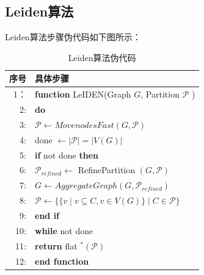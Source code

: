 \documentclass {article}
\begin{document}
	\subsection{Leiden算法}
	\label{Leiden算法原理}
	Leiden算法步骤伪代码如下图所示：
	\begin{table}[H]
		\centering
		\caption{Leiden算法伪代码}
		\begin{tabular}{rl}
			\hline
			序号 & {具体步骤}\\ \hline
			1：& \textbf{function} LeIDEN(Graph $G$, Partition $\mathcal{P}$ ) \\
			2: & \quad \textbf{do} \\
			3: & \qquad $\mathcal{P} \leftarrow {MovenodesFast}(G, \mathcal{P})$ \\
			4: & \qquad done $\leftarrow|\mathcal{P}|=|V(G)|$ \\
			5: & \qquad \textbf{if} not done \textbf{then} \\
			6: & \qquad \quad $\mathcal{P}_{ {refined }} \leftarrow$ RefinePartition $(G, \mathcal{P})$ \\
			7: & \qquad \quad $G \leftarrow {AggregateGraph}\left(G, \mathcal{P}_{ {refined }}\right)$ \\
			8: & \qquad \quad $\mathcal{P} \leftarrow\{\{v \mid v \subseteq C, v \in V(G)\} \mid C \in \mathcal{P}\}$ \\
			9: & \qquad \textbf{end if} \\
			10: & \quad \textbf{while} not done \\
			11: & \quad \textbf{return} flat ${ }^*(\mathcal{P})$ \\
			12: & \textbf{end function} \\
		\end{tabular}
	\end{table}	
\end{document}
